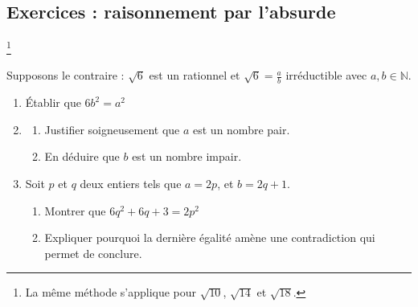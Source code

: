 \subsection{Exercices : raisonnement par l'absurde}
\begin{exercise}\footnote{La même méthode s'applique pour $\sqrt{10}$, $\sqrt{14}$ et $\sqrt{18}$.}   
	
Supposons le contraire : $\sqrt{6}$ est un rationnel et $\sqrt{6}=\frac{a}{b}$ irréductible avec $a, b\in\mathbb{N}$.
\begin{enumerate}[label={\arabic*)},leftmargin=*]
	\item Établir que $6b^2=a^2$
	\item 
	\begin{enumerate}[label={\alph*)},leftmargin=*] 
		\item Justifier soigneusement que $a$ est un nombre pair.
		\item En déduire que $b$ est un nombre impair.
	\end{enumerate}
	\item Soit $p$ et $q$ deux entiers tels que $a=2p$, et $b=2q+1$.
	\begin{enumerate}[label={\alph*)},leftmargin=*] 
		\item Montrer que $6q^2+6q+3=2p^2$
		\item Expliquer pourquoi la dernière égalité amène une contradiction qui permet de conclure.
	\end{enumerate}
\end{enumerate} 
\end{exercise}
\vfill 
